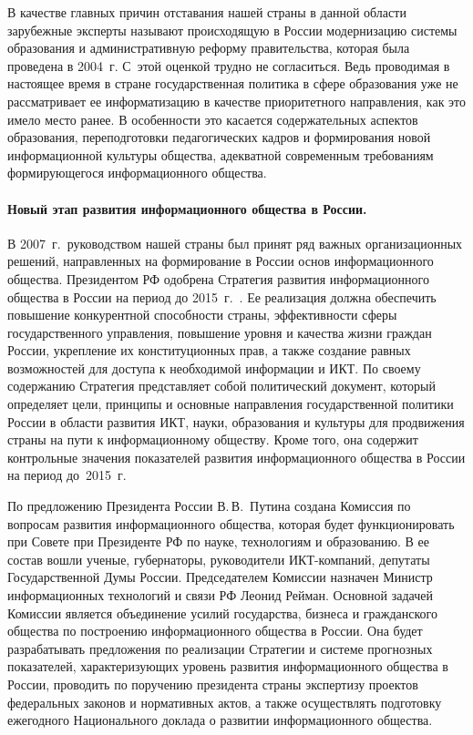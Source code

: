 \begin{multicols}{2}
     В качестве главных причин отставания нашей страны в данной области зарубежные
эксперты называют происходящую в России модернизацию сис\-те\-мы образования и
административную реформу правительства, которая была проведена в 2004~г. С~этой
оценкой трудно не согласиться. Ведь проводимая в настоящее время в стране
государственная политика в сфере образования уже не рассматривает ее информатизацию
в качестве приоритетного направления, как это имело место ранее. В особенности это
касается содержательных аспектов образования, переподготовки педагогических кадров и
формирования новой информационной культуры общества, адекватной современным
требованиям формирующегося информационного общества.

\vspace*{-3pt}
\paragraph*{Новый этап развития информационного общества в России.} В
2007~г.\ руководством нашей страны был принят ряд важных организационных решений, %
направ\-лен\-ных на формирование в России основ информационного общества.
Президентом РФ одоб\-ре\-на Стратегия развития информационного общества в России на
период до 2015~г.~\cite{2ss}. Ее реализация должна обеспечить повышение конкурентной
способности страны, эффективности сферы государственного управления, повышение
уровня и качества жизни граждан России, укрепление их конституционных прав, а также
создание равных возможностей для доступа к необходимой информации и ИКТ. По
своему содержанию Стратегия представляет собой политический документ, который
определяет цели, принципы и основные на\-прав\-ле\-ния государственной политики России в
области развития ИКТ, науки, образования и культуры для продвижения страны на пути к
информационному обществу. Кроме того, она содержит контрольные значения
показателей развития информационного общества в России на период %
до~2015~г.

     По предложению Президента России В.\,В.~Путина создана Комиссия по вопросам
развития информационного общества, которая будет функционировать при Совете при
Президенте РФ по науке, технологиям и образованию. В ее состав вошли ученые,
губернаторы, руководители ИКТ-компаний, депутаты Государственной Думы России.
Председателем Комиссии назначен Министр информационных технологий и связи РФ
Леонид Рейман. Основной задачей Комиссии является объединение усилий государства,
бизнеса и гражданского общества по построению информационного общества в России.
Она будет разрабатывать предложения по реализации Стратегии и системе прогнозных
показателей, характеризующих уровень развития информационного общества в России,
проводить по поручению президента страны экспертизу проектов федеральных законов и
нормативных актов, а также осуществлять подготовку ежегодного Национального доклада
о развитии информационного общества.


\end{multicols}
